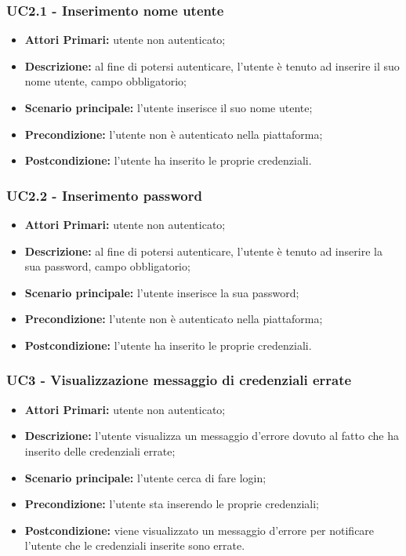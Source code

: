 \subsubsection{UC2.1 - Inserimento nome utente}
\begin{itemize}
	\item \textbf{Attori Primari:} utente non autenticato;
	\item \textbf{Descrizione:} al fine di potersi autenticare, l'utente è tenuto ad inserire il suo nome utente, campo obbligatorio;
	\item \textbf{Scenario principale:} l'utente inserisce il suo nome utente;
	\item \textbf{Precondizione:} l'utente non è autenticato nella piattaforma;
	\item \textbf{Postcondizione:} l'utente ha inserito le proprie credenziali.
\end{itemize}	

\subsubsection{UC2.2 - Inserimento password}
\begin{itemize}
	\item \textbf{Attori Primari:} utente non autenticato;
	\item \textbf{Descrizione:} al fine di potersi autenticare, l'utente è tenuto ad inserire la sua password, campo obbligatorio;
	\item \textbf{Scenario principale:} l'utente inserisce la sua password;
	\item \textbf{Precondizione:} l'utente non è autenticato nella piattaforma;
	\item \textbf{Postcondizione:} l'utente ha inserito le proprie credenziali.
\end{itemize}	

\subsubsection{UC3 - Visualizzazione messaggio di credenziali errate}
\begin{itemize}
	\item \textbf{Attori Primari:} utente non autenticato;
	\item \textbf{Descrizione:} l'utente visualizza un messaggio d'errore dovuto al fatto che ha inserito delle credenziali errate;
	\item \textbf{Scenario principale:} l'utente cerca di fare login;
	\item \textbf{Precondizione:} l'utente sta inserendo le proprie credenziali;
	\item \textbf{Postcondizione:} viene visualizzato un messaggio d'errore per notificare l'utente che le credenziali inserite sono errate.
\end{itemize}




